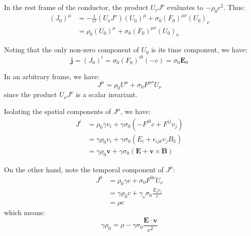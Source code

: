 \documentclass[12pt]{article}
\begin{document}

In the rest frame of the conductor, the product $U_{\nu} J^{\nu}$ evaluates to $-\rho_{0} c^{2}$. Thus:
\begin{equation}
    \begin{split}
        (J_{0})^{\mu} &= -\frac{1}{c^{2}} (U_{\nu} J^{\nu}) (U_{0})^{\mu} + \sigma_{0} (F_{0})^{\mu \nu} (U_{0})_{\nu} \\
        &= \rho_{0} (U_{0})^{\mu} + \sigma_{0} (F_{0})^{\mu \nu} (U_{0})_{\nu}
    \end{split}
\end{equation}

Noting that the only non-zero component of $U_{0}$ is its time component, we have:
\begin{equation}
    \mathbf{j} = (J_{0})^{i} = \sigma_{0} (F_{0})^{i0} (-c) = \sigma_{0} \mathbf{E}_{0}
\end{equation}

In an arbitrary frame, we have:
\begin{equation}
    J^{\mu} = \rho_{0} U^{\mu} + \sigma_{0} F^{\mu \nu} U_{\nu}
\end{equation}
since the product $U_{\nu} J^{\nu}$ is a scalar invariant.

Isolating the spatial components of $J^{\mu}$, we have:
\begin{equation}
    \begin{split}
        J^{i} &= \rho_{0} \gamma v_{i} + \gamma \sigma_{0} (-F^{i0}c + F^{ij} v_{j}) \\
        &= \gamma \rho_{0} v_{i} + \gamma \sigma_{0} (E_{i} + \epsilon_{ijk} v_{j} B_{k}) \\
        &= \gamma \rho_{0} \mathbf{v} + \gamma \sigma_{0} (\mathbf{E} + \mathbf{v} \times \mathbf{B})
    \end{split}
\end{equation}

On the other hand, note the temporal component of $J^{\mu}$:
\begin{equation}
    \begin{split}
        J^{0} &= \rho_{0} \gamma c + \sigma_{0} F^{0\nu} U_{\nu} \\
        &= \gamma \rho_{0} c + \gamma_{v} \sigma_{0} \frac{E_{i} v_{i}}{c} \\
        &= \rho c
    \end{split}
\end{equation}
which means:
\begin{equation}
    \gamma \rho_{0} = \rho - \gamma \sigma_{0} \frac{\mathbf{E} \cdot \mathbf{v}}{c^{2}}
\end{equation}
\end{document}
